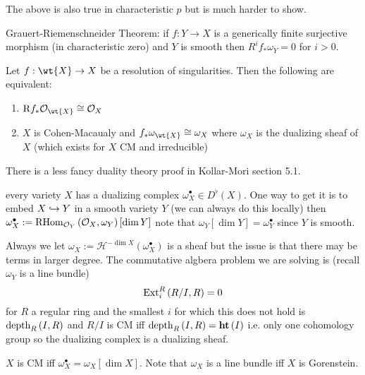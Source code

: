 \documentclass[12pt]{article}
\newcommand{\R}{\mathrm{R}}
\renewcommand{\cH}{\mathcal{H}}
\begin{document}
\begin{rmk}
The above is also true in characteristic $p$ but is much harder to show.
\end{rmk}

\begin{exercise}
Grauert-Riemenschneider Theorem: if $f : Y \to X$ is a generically finite surjective morphism (in characteristic zero) and $Y$ is smooth then $R^i f_* \omega_Y = 0$ for $i > 0$. 
\end{exercise}
 
\begin{prop}
Let $f : \wt{X} \to X$ be a resolution of singularities. Then the following are equivalent:
\begin{enumerate}
\item $\R f_* \struct{\wt{X}} \cong \struct{X}$ 
\item $X$ is Cohen-Macaualy and $f_* \omega_{\wt{X}} \cong \omega_X$ where $\omega_X$ is the dualizing sheaf of $X$ (which exists for $X$ CM and irreducible)
\end{enumerate}
\end{prop}

\begin{rmk}
There is a less fancy duality theory proof in Kollar-Mori section 5.1. 
\end{rmk}

\begin{prop}
every variety $X$ has a dualizing complex $\omega_X^\bullet \in D^\flat(X)$. One way to get it is to embed $X \hookrightarrow Y$ in a smooth variety $Y$ (we can always do this locally) then $\omega_X^\bullet := \mathrm{RHom}_{\mathcal{O}_{Y}} \left( \mathcal{O}_{X}, \omega_Y \right)[\dim{Y}]$ note that $\omega_Y[\dim{Y}] = \omega_Y^\bullet$ since $Y$ is smooth. 
\end{prop} 
 
\begin{rmk}
Always we let $\omega_X := \cH^{-\dim{X}}(\omega_X^\bullet)$ is a sheaf but the issue is that there may be terms in larger degree. The commutative algbera problem we are solving is (recall $\omega_Y$ is a line bundle)
\[ \mathrm{Ext}^{R}_{i} \left( R/I, R \right) = 0 \]
for $R$ a regular ring and the smallest $i$ for which this does not hold is $\mathrm{depth}_{R} \left( I,R \right)$ and $R/I$ is CM iff $\mathrm{depth}_{R} \left( I,R \right) = \mathbf{ht}\left( I \right)$ i.e. only one cohomology group so the dualizing complex is a dualizing sheaf. 
\end{rmk}
 
\begin{lemma}
$X$ is CM iff $\omega_X^\bullet = \omega_X[\dim{X}]$. Note that $\omega_X$ is a line bundle iff $X$ is Gorenstein. 
\end{lemma}
\end{document}
